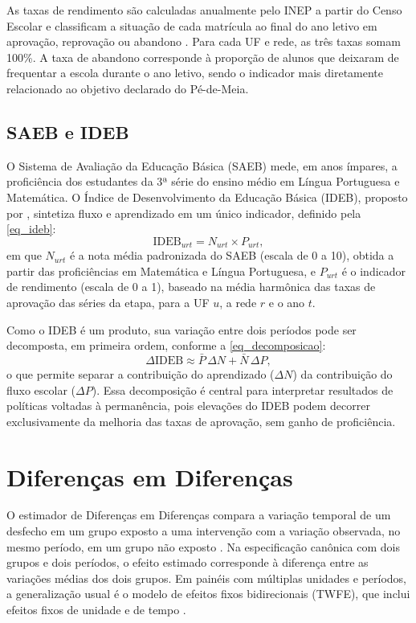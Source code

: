 As taxas de rendimento são calculadas anualmente pelo INEP a partir do Censo Escolar e classificam a situação de cada matrícula ao final do ano letivo em aprovação, reprovação ou abandono \cite{INEP2026Rendimento}.
Para cada UF e rede, as três taxas somam 100\%.
A taxa de abandono corresponde à proporção de alunos que deixaram de frequentar a escola durante o ano letivo, sendo o indicador mais diretamente relacionado ao objetivo declarado do Pé-de-Meia.

\subsection{SAEB e IDEB}
\label{subsec_saeb_ideb}

O Sistema de Avaliação da Educação Básica (SAEB) mede, em anos ímpares, a proficiência dos estudantes da 3ª série do ensino médio em Língua Portuguesa e Matemática.
O Índice de Desenvolvimento da Educação Básica (IDEB), proposto por , sintetiza fluxo e aprendizado em um único indicador, definido pela \autoref{eq_ideb}:
\begin{equation}
    \label{eq_ideb}
    \text{IDEB}_{urt} = N_{urt} \times P_{urt},
\end{equation}
em que $N_{urt}$ é a nota média padronizada do SAEB (escala de 0 a 10), obtida a partir das proficiências em Matemática e Língua Portuguesa, e $P_{urt}$ é o indicador de rendimento (escala de 0 a 1), baseado na média harmônica das taxas de aprovação das séries da etapa, para a UF $u$, a rede $r$ e o ano $t$.

Como o IDEB é um produto, sua variação entre dois períodos pode ser decomposta, em primeira ordem, conforme a \autoref{eq_decomposicao}:
\begin{equation}
    \label{eq_decomposicao}
    \Delta\text{IDEB} \approx \bar{P}\,\Delta N + \bar{N}\,\Delta P,
\end{equation}
o que permite separar a contribuição do aprendizado ($\Delta N$) da contribuição do fluxo escolar ($\Delta P$).
Essa decomposição é central para interpretar resultados de políticas voltadas à permanência, pois elevações do IDEB podem decorrer exclusivamente da melhoria das taxas de aprovação, sem ganho de proficiência.

\section{Diferenças em Diferenças}
\label{sec_did}

O estimador de Diferenças em Diferenças compara a variação temporal de um desfecho em um grupo exposto a uma intervenção com a variação observada, no mesmo período, em um grupo não exposto \cite{Angrist2009}.
Na especificação canônica com dois grupos e dois períodos, o efeito estimado corresponde à diferença entre as variações médias dos dois grupos.
Em painéis com múltiplas unidades e períodos, a generalização usual é o modelo de efeitos fixos bidirecionais (TWFE), que inclui efeitos fixos de unidade e de tempo \cite{Wooldridge2010}.


